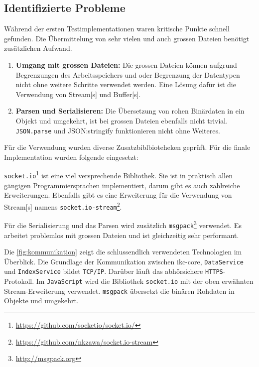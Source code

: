 \subsection{Identifizierte Probleme}


Während der ersten Testimplementationen waren kritische Punkte schnell gefunden. Die Übermittelung von sehr vielen und auch grossen Dateien benötigt zusätzlichen Aufwand.

\begin{enumerate}
    \item \textbf{Umgang mit grossen Dateien:} Die grossen Dateien können auf\-grund Begrenzungen des Arbeitsspeichers und oder Be\-grenz\-ung der Datentypen nicht ohne weitere Schritte verwendet werden. Eine Lösung dafür ist die Verwendung von \gls{Stream}[s] und \gls{Buffer}[s].
    \item \textbf{Parsen und Serialisieren:} Die Übersetzung von rohen Bi\-när\-da\-ten in ein Objekt und umgekehrt, ist bei grossen Dateien ebenfalls nicht trivial. \texttt{JSON.parse} und {JSON:stringify} funktionieren nicht ohne Weiteres.
\end{enumerate}

Für die Verwendung wurden diverse Zusatzbiblbioteheken geprüft. Für die finale Implementation wurden folgende eingesetzt:

\texttt{socket.io}\footnote{\url{https://github.com/socketio/socket.io/}} ist eine viel versprechende Bibliothek. Sie ist in praktisch allen gängigen Programmiersprachen implementiert, darum gibt es auch zahlreiche Erweiterungen. Ebenfalls gibt es eine Erweiterung für die Verwendung von \gls{Stream}[s] namens \texttt{socket.io-stream}\footnote{\url{https://github.com/nkzawa/socket.io-stream}}.

Für die Serialisierung und das Parsen wird zusätzlich \texttt{msgpack}\footnote{\url{http://msgpack.org}} verwendet. Es arbeitet problemlos mit grossen Dateien und ist gleichzeitig sehr performant.

Die \autoref{fig:kommunikation} zeigt die schlussendlich verwendeten Technologien im Überblick. Die Grundlage der Kommunikation zwischen \gls{ikc-core}, \texttt{DataService} und \texttt{IndexService} bildet \texttt{TCP/IP}. Darüber läuft das abhörsichere \texttt{HTTPS}-Protokoll. Im \texttt{JavaScript} wird die Bibliothek \texttt{socket.io} mit der oben erwähnten \gls{Stream}-Erweiterung verwendet. \texttt{msgpack} übersetzt die binären Rohdaten in Objekte und umgekehrt.

